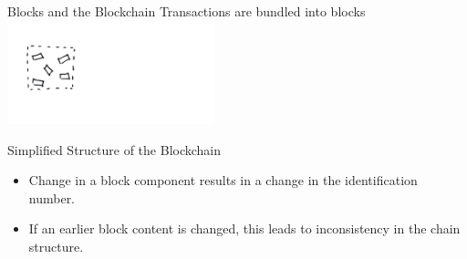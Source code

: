 \documentclass[]{beamer}
\begin{document}
\begin{frame}{Blocks and the Blockchain}
Transactions are bundled into blocks \\
\includegraphics[width=6cm]{../assets/images/block_1.png} \\
\end{frame}

\begin{frame}{Simplified Structure of the Blockchain}
\begin{figure}[h!]
	\center
	
\end{figure}
\begin{itemize}
\item{Change in a block component results in a change in the identification number.}
\item{If an earlier block content is changed, this leads to inconsistency in the chain structure.}
\end{itemize}
\end{frame}
\end{document}
